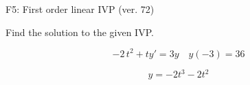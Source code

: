 \begin{exercise}
  \begin{exerciseTitle}F5: First order linear IVP (ver. 72)\end{exerciseTitle}
  \begin{exerciseStatement}
    
Find the solution to the given IVP.

    
\[-2 \, t^{2} +ty'= 3 y \hspace{1em} y( -3 ) = 36\]

  \end{exerciseStatement}
  \begin{exerciseAnswer}
    
\[y= -2 t^ 3 -2 t^{2}\]

  \end{exerciseAnswer}
\end{exercise}